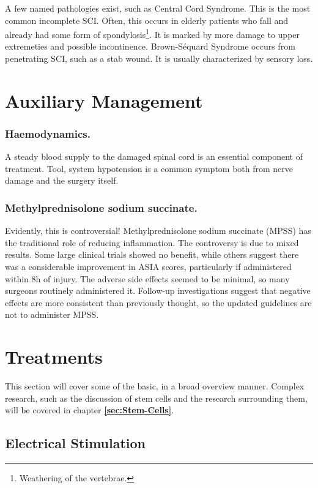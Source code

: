 A few named pathologies exist, such as Central Cord Syndrome. This is the most common incomplete SCI. Often, this occurs in elderly patients who fall and already had some form of spondylosis\footnote{Weathering of the vertebrae.}. It is marked by more damage to upper extremeties and possible incontinence. Brown-Séquard Syndrome occurs from penetrating SCI, such as a stab wound. It is usually characterized by sensory loss. 

\section{Auxiliary Management}

\subsubsection{Haemodynamics.}
A steady blood supply to the damaged spinal cord is an essential component of treatment. Tool, system hypotension is a common symptom both from nerve damage and the surgery itself. 

\subsubsection{Methylprednisolone sodium succinate.}
Evidently, this is controversial! Methylprednisolone sodium succinate (MPSS) has the traditional role of reducing inflammation. The controversy is due to mixed results. Some large clinical trials showed no benefit, while others suggest there was a considerable improvement in ASIA scores, particularly if administered within 8h of injury. The adverse side effects seemed to be minimal, so many surgeons routinely administered it. Follow-up investigations suggest that negative effects are more consistent than previously thought, so the updated guidelines are not to administer MPSS. 

\section{Treatments}

This section will cover some of the basic, in a broad overview manner. Complex research, such as the discussion of stem cells and the research surrounding them, will be covered in chapter \textbf{\ref{sec:Stem-Cells}}. \newline

\subsection{Electrical Stimulation}

